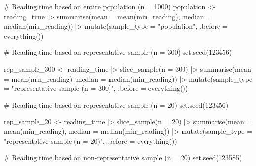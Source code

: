 \documentclass[
  letterpaper,
]{krantz}
\makeatletter
\newenvironment{Shaded}{\begin{snugshade}}{\end{snugshade}}
\newcommand{\AttributeTok}[1]{\textcolor[rgb]{0.40,0.45,0.13}{#1}}
\newcommand{\CommentTok}[1]{\textcolor[rgb]{0.37,0.37,0.37}{#1}}
\newcommand{\DecValTok}[1]{\textcolor[rgb]{0.68,0.00,0.00}{#1}}
\newcommand{\FunctionTok}[1]{\textcolor[rgb]{0.28,0.35,0.67}{#1}}
\newcommand{\NormalTok}[1]{\textcolor[rgb]{0.00,0.23,0.31}{#1}}
\newcommand{\OtherTok}[1]{\textcolor[rgb]{0.00,0.23,0.31}{#1}}
\newcommand{\SpecialCharTok}[1]{\textcolor[rgb]{0.37,0.37,0.37}{#1}}
\newcommand{\StringTok}[1]{\textcolor[rgb]{0.13,0.47,0.30}{#1}}
\newenvironment{kframe}{%
\medskip{}
\setlength{\fboxsep}{.8em}
 \def\at@end@of@kframe{}%
 \ifinner\ifhmode%
  \def\at@end@of@kframe{\end{minipage}}%
  \begin{minipage}{\columnwidth}%
 \fi\fi%
 \def\FrameCommand##1{\hskip\@totalleftmargin \hskip-\fboxsep
 \colorbox{shadecolor}{##1}\hskip-\fboxsep
     \hskip-\linewidth \hskip-\@totalleftmargin \hskip\columnwidth}%
 \MakeFramed {\advance\hsize-\width
   \@totalleftmargin\z@ \linewidth\hsize
   \@setminipage}}%
 {\par\unskip\endMakeFramed%
 \at@end@of@kframe}
\renewenvironment{Shaded}{\begin{kframe}}{\end{kframe}}
\makeatother
\begin{document}
\begin{Shaded}
\begin{Highlighting}[]
\CommentTok{\# Reading time based on entire population (n = 1000)}
\NormalTok{population }\OtherTok{\textless{}{-}}\NormalTok{ reading\_time }\SpecialCharTok{|\textgreater{}}
  \FunctionTok{summarise}\NormalTok{(}\AttributeTok{mean =} \FunctionTok{mean}\NormalTok{(min\_reading),}
            \AttributeTok{median =} \FunctionTok{median}\NormalTok{(min\_reading)) }\SpecialCharTok{|\textgreater{}}
  \FunctionTok{mutate}\NormalTok{(}\AttributeTok{sample\_type =} \StringTok{"population"}\NormalTok{,}
         \AttributeTok{.before =} \FunctionTok{everything}\NormalTok{())}


\CommentTok{\# Reading time based on representative sample (n = 300)}
\FunctionTok{set.seed}\NormalTok{(}\DecValTok{123456}\NormalTok{)}

\NormalTok{rep\_sample\_300 }\OtherTok{\textless{}{-}}
\NormalTok{  reading\_time }\SpecialCharTok{|\textgreater{}}
  \FunctionTok{slice\_sample}\NormalTok{(}\AttributeTok{n =} \DecValTok{300}\NormalTok{) }\SpecialCharTok{|\textgreater{}}
  \FunctionTok{summarise}\NormalTok{(}\AttributeTok{mean =} \FunctionTok{mean}\NormalTok{(min\_reading),}
            \AttributeTok{median =} \FunctionTok{median}\NormalTok{(min\_reading)) }\SpecialCharTok{|\textgreater{}}
  \FunctionTok{mutate}\NormalTok{(}\AttributeTok{sample\_type =} \StringTok{"representative sample (n = 300)"}\NormalTok{,}
         \AttributeTok{.before =} \FunctionTok{everything}\NormalTok{())}

\CommentTok{\# Reading time based on representative sample (n = 20)}
\FunctionTok{set.seed}\NormalTok{(}\DecValTok{123456}\NormalTok{)}

\NormalTok{rep\_sample\_20 }\OtherTok{\textless{}{-}}
\NormalTok{  reading\_time }\SpecialCharTok{|\textgreater{}}
  \FunctionTok{slice\_sample}\NormalTok{(}\AttributeTok{n =} \DecValTok{20}\NormalTok{) }\SpecialCharTok{|\textgreater{}}
  \FunctionTok{summarise}\NormalTok{(}\AttributeTok{mean =} \FunctionTok{mean}\NormalTok{(min\_reading),}
            \AttributeTok{median =} \FunctionTok{median}\NormalTok{(min\_reading)) }\SpecialCharTok{|\textgreater{}}
  \FunctionTok{mutate}\NormalTok{(}\AttributeTok{sample\_type =} \StringTok{"representative sample (n = 20)"}\NormalTok{,}
         \AttributeTok{.before =} \FunctionTok{everything}\NormalTok{())}

\CommentTok{\# Reading time based on non{-}representative sample (n = 20)}
\FunctionTok{set.seed}\NormalTok{(}\DecValTok{123585}\NormalTok{)}


\end{Highlighting}
\end{Shaded}
\end{document}
